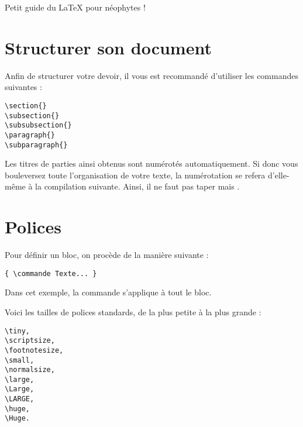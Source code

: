 Petit guide du LaTeX pour néophytes !

\section{Structurer son document}
Anfin de structurer votre devoir, il vous est recommandé d'utiliser les commandes suivantes :
\begin{verbatim}
\section{}
\subsection{}
\subsubsection{}
\paragraph{}
\subparagraph{}
\end{verbatim}
Les titres de parties ainsi obtenus sont numérotés automatiquement. Si donc vous bouleversez toute l'organisation de votre texte, la numérotation se refera d'elle-même à la compilation suivante. Ainsi, il ne faut pas taper  mais .

\section{Polices}
Pour définir un bloc, on procède de la manière suivante :
\begin{verbatim}
{ \commande Texte... }
\end{verbatim}
Dans cet exemple, la commande s'applique à tout le bloc.

Voici les tailles de polices standards, de la plus petite à la plus grande :
\begin{verbatim}
\tiny,
\scriptsize,
\footnotesize,
\small,
\normalsize,
\large,
\Large,
\LARGE,
\huge,
\Huge.
\end{verbatim}

